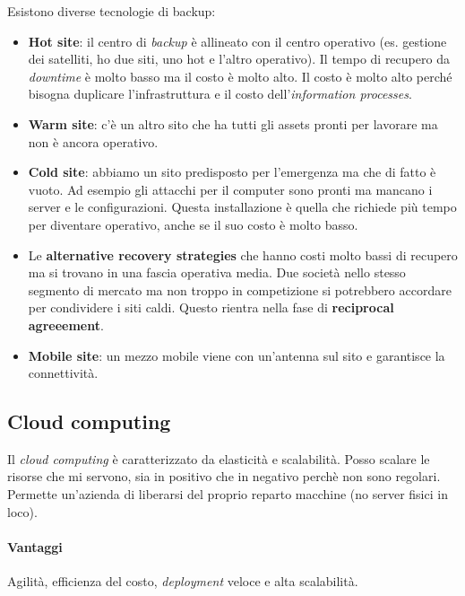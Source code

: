 Esistono diverse tecnologie di backup:
\begin{itemize}
  \item \textbf{Hot site}: il centro di \textit{backup} è allineato con il 
  centro operativo (es. gestione dei satelliti, ho due siti, uno hot e l'altro 
  operativo). Il tempo di recupero da \textit{downtime} è molto basso ma il 
  costo è molto alto. Il costo è molto alto perché bisogna duplicare 
  l'infrastruttura e il costo dell'\textit{information processes}.
  
  \item \textbf{Warm site}: c'è un altro sito che ha tutti gli assets pronti 
  per lavorare ma non è ancora operativo.
  
  \item \textbf{Cold site}: abbiamo un sito predisposto per l'emergenza ma che 
  di fatto è vuoto. Ad esempio gli attacchi per il computer sono pronti ma 
  mancano i server e le configurazioni. Questa installazione è quella che 
  richiede più tempo per diventare operativo, anche se il suo costo è molto 
  basso.
  
  \item Le \textbf{alternative recovery strategies} che hanno costi molto bassi 
  di recupero ma si trovano in una fascia operativa media. Due società nello 
  stesso segmento di mercato ma non troppo in competizione si potrebbero 
  accordare per condividere i siti caldi. Questo rientra nella fase di 
  \textbf{reciprocal agreeement}.
  
  
  \item \textbf{Mobile site}: un mezzo mobile viene con un'antenna sul sito e 
  garantisce la connettività.
  
\end{itemize}


\subsection{Cloud computing}

Il \textit{cloud computing} è caratterizzato da elasticità e scalabilità. Posso 
scalare le risorse che mi servono, sia in positivo che in negativo perchè non 
sono regolari. Permette un'azienda di liberarsi del proprio reparto macchine 
(no server fisici in loco).

\paragraph*{Vantaggi} Agilità, efficienza del costo, \textit{deployment} veloce 
e alta scalabilità.

